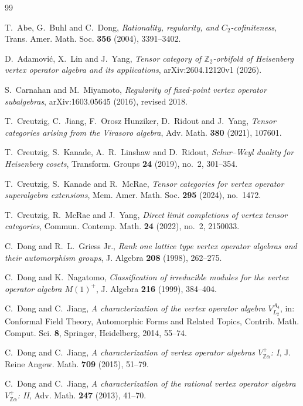 \documentclass[12pt,leqno]{amsart}
\numberwithin{equation}{section} \newtheorem{thm}{Theorem}[section] \newtheorem{lem}[thm]{Lemma} \newtheorem{ex}[thm]{Example} \newtheorem{prop}[thm]{Proposition} \newtheorem{cor}[thm]{Corollary} \newtheorem{defi}[thm]{Definition} \newtheorem{rmk}[thm]{Remark} \newtheorem{notation}[thm]{Notation}
\begin{document}
\begingroup
\linespread{1.00}\selectfont
\begin{thebibliography}{99}

T.~Abe, G.~Buhl and C.~Dong,
\emph{Rationality, regularity, and $C_2$-cofiniteness},
Trans. Amer. Math. Soc. \textbf{356} (2004), 3391--3402.

D.~Adamovi\'c, X.~Lin and J.~Yang,
\emph{Tensor category of $\mathbb Z_2$-orbifold of Heisenberg vertex operator algebra and its applications},
arXiv:2604.12120v1 (2026).

S.~Carnahan and M.~Miyamoto,
\emph{Regularity of fixed-point vertex operator subalgebras},
arXiv:1603.05645 (2016), revised 2018.

T.~Creutzig, C.~Jiang, F.~Orosz Hunziker, D.~Ridout and J.~Yang,
\emph{Tensor categories arising from the Virasoro algebra},
Adv. Math. \textbf{380} (2021), 107601.

T.~Creutzig, S.~Kanade, A.~R.~Linshaw and D.~Ridout,
\emph{Schur--Weyl duality for Heisenberg cosets},
Transform. Groups \textbf{24} (2019), no.~2, 301--354.

T.~Creutzig, S.~Kanade and R.~McRae,
\emph{Tensor categories for vertex operator superalgebra extensions},
Mem. Amer. Math. Soc. \textbf{295} (2024), no.~1472.

T.~Creutzig, R.~McRae and J.~Yang,
\emph{Direct limit completions of vertex tensor categories},
Commun. Contemp. Math. \textbf{24} (2022), no.~2, 2150033.

C.~Dong and R.~L.~Griess Jr.,
\emph{Rank one lattice type vertex operator algebras and their automorphism groups},
J. Algebra \textbf{208} (1998), 262--275.

C.~Dong and K.~Nagatomo,
\emph{Classification of irreducible modules for the vertex operator algebra $M(1)^+$},
J. Algebra \textbf{216} (1999), 384--404.

C.~Dong and C.~Jiang,
\emph{A characterization of the vertex operator algebra $V_{L_2}^{A_4}$},
in: Conformal Field Theory, Automorphic Forms and Related Topics,
Contrib. Math. Comput. Sci. \textbf{8}, Springer, Heidelberg, 2014, 55--74.

C.~Dong and C.~Jiang,
\emph{A characterization of vertex operator algebras $V_{\mathbb Z\alpha}^{+}$: I},
J. Reine Angew. Math. \textbf{709} (2015), 51--79.

C.~Dong and C.~Jiang,
\emph{A characterization of the rational vertex operator algebra $V_{\mathbb Z\alpha}^{+}$: II},
Adv. Math. \textbf{247} (2013), 41--70.


\end{thebibliography}
\end{document}
